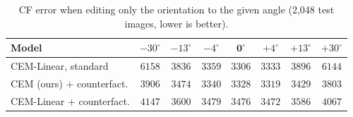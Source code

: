 \begin{table}[h]
\centering\small
\caption{CF error when editing only the orientation to the given angle
(2{,}048 test images, lower is better).}
\label{tab:app-orient}
\begin{tabular}{lccccccc}
\toprule
\textbf{Model} & $-30^\circ$ & $-13^\circ$ & $-4^\circ$ & $\mathbf{0^\circ}$ & $+4^\circ$ & $+13^\circ$ & $+30^\circ$ \\
\midrule
CEM-Linear, standard       & $6158$ & $3836$ & $3359$ & $3306$ & $3333$ & $3896$ & $6144$ \\
CEM (ours) + counterfact.  & $3906$ & $3474$ & $3340$ & $3328$ & $3319$ & $3429$ & $3803$ \\
CEM-Linear + counterfact.  & $4147$ & $3600$ & $3479$ & $3476$ & $3472$ & $3586$ & $4067$ \\
\bottomrule
\end{tabular}
\end{table}
